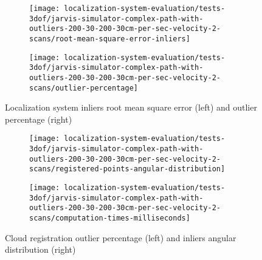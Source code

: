 \begin{figure}[ht]
	\centering
	\begin{subfigure}[h]{0.47\textwidth}
		\centering
		\texttt{[image: localization-system-evaluation/tests-3dof/jarvis-simulator-complex-path-with-outliers-200-30-200-30cm-per-sec-velocity-2-scans/root-mean-square-error-inliers]}
	\end{subfigure}
	\begin{subfigure}[h]{0.47\textwidth}
		\centering
		\texttt{[image: localization-system-evaluation/tests-3dof/jarvis-simulator-complex-path-with-outliers-200-30-200-30cm-per-sec-velocity-2-scans/outlier-percentage]}
	\end{subfigure}
	\caption{Localization system inliers root mean square error (left) and outlier percentage (right)}
	\label{fig:localization-system-evaluation_jarvis-simulator-complex-path-with-outliers-200-30-200-30cm-per-sec-velocity-2-scans_inliers-rmse-outliers-percentage}
\end{figure}

\begin{figure}[hb]
	\centering
	\begin{subfigure}[h]{0.47\textwidth}
		\centering
		\texttt{[image: localization-system-evaluation/tests-3dof/jarvis-simulator-complex-path-with-outliers-200-30-200-30cm-per-sec-velocity-2-scans/registered-points-angular-distribution]}
	\end{subfigure}
	\begin{subfigure}[h]{0.47\textwidth}
		\centering
		\texttt{[image: localization-system-evaluation/tests-3dof/jarvis-simulator-complex-path-with-outliers-200-30-200-30cm-per-sec-velocity-2-scans/computation-times-milliseconds]}
	\end{subfigure}
	\caption{Cloud registration outlier percentage (left) and inliers angular distribution (right)}
	\label{fig:localization-system-evaluation_jarvis-simulator-complex-path-with-outliers-200-30-200-30cm-per-sec-velocity-2-scans_angular-distribution-analysis-computation-time}
\end{figure}
